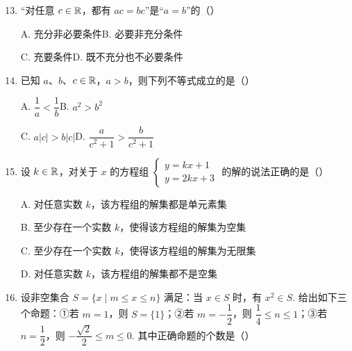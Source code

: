\documentclass[a4paper,11pt]{article}
\begin{document}

\begin{enumerate}
\setcounter{enumi}{12}

\item “对任意 $c\in\mathbb{R}$，都有 $ac=bc$”是“$a=b$”的\mbox{（\quad）}

\keepwithprev
A. 充分非必要条件\qquad\qquad B. 必要非充分条件

C. 充要条件\qquad\qquad\qquad D. 既不充分也不必要条件

\ifanswer
\solbegin
{}
\solend
\fi

\item 已知 $a$、$b$、$c\in\mathbb{R}$，$a>b$，则下列不等式成立的是\mbox{（\quad）}

\keepwithprev
A. $\dfrac1a<\dfrac1b$\qquad\qquad B. $a^2>b^2$

C. $a\lvert c\rvert>b\lvert c\rvert$\qquad\qquad D. $\dfrac{a}{c^2+1}>\dfrac{b}{c^2+1}$

\ifanswer
\solbegin
{}
\solend
\fi

\item 设 $k\in\mathbb{R}$，对关于 $x$ 的方程组
$\begin{cases}y=kx+1\\y=2kx+3\end{cases}$
的解的说法正确的是\mbox{（\quad）}

\keepwithprev
A. 对任意实数 $k$，该方程组的解集都是单元素集

B. 至少存在一个实数 $k$，使得该方程组的解集为空集

C. 至少存在一个实数 $k$，使得该方程组的解集为无限集

D. 对任意实数 $k$，该方程组的解集都不是空集

\ifanswer
\solbegin
{}
\solend
\fi

\item 设非空集合 $S=\{x\mid m\leqslant x\leqslant n\}$ 满足：当 $x\in S$ 时，有 $x^2\in S$. 给出如下三个命题：①若
$m=1$，则 $S=\{1\}$；②若 $m=-\dfrac12$，则 $\dfrac14\leqslant n\leqslant1$；③若 $n=\dfrac12$，则 $-\dfrac{\sqrt2}2\leqslant m\leqslant0$. 其中正确命题的个数是\mbox{（\quad）}


\end{enumerate}
\end{document}
